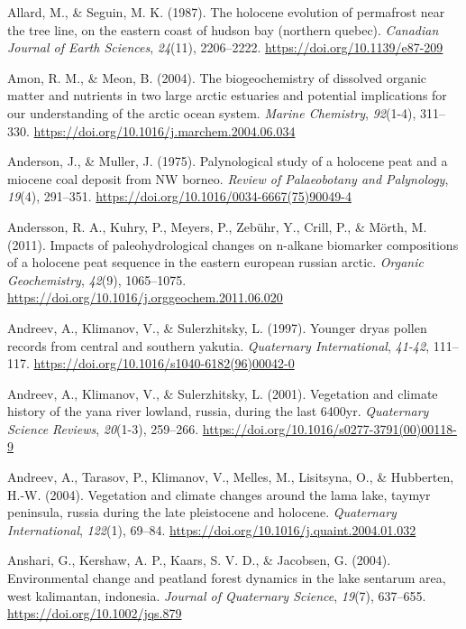 \documentclass[]{article}
\begin{document}
\leavevmode\hypertarget{ref-Allard_1987}{}%
Allard, M., \& Seguin, M. K. (1987). The holocene evolution of
permafrost near the tree line, on the eastern coast of hudson bay
(northern quebec). \emph{Canadian Journal of Earth Sciences},
\emph{24}(11), 2206--2222. \url{https://doi.org/10.1139/e87-209}

\leavevmode\hypertarget{ref-Amon_2004}{}%
Amon, R. M., \& Meon, B. (2004). The biogeochemistry of dissolved
organic matter and nutrients in two large arctic estuaries and potential
implications for our understanding of the arctic ocean system.
\emph{Marine Chemistry}, \emph{92}(1-4), 311--330.
\url{https://doi.org/10.1016/j.marchem.2004.06.034}

\leavevmode\hypertarget{ref-Anderson_1975}{}%
Anderson, J., \& Muller, J. (1975). Palynological study of a holocene
peat and a miocene coal deposit from NW borneo. \emph{Review of
Palaeobotany and Palynology}, \emph{19}(4), 291--351.
\url{https://doi.org/10.1016/0034-6667(75)90049-4}

\leavevmode\hypertarget{ref-Andersson_2011}{}%
Andersson, R. A., Kuhry, P., Meyers, P., Zebühr, Y., Crill, P., \&
Mörth, M. (2011). Impacts of paleohydrological changes on n-alkane
biomarker compositions of a holocene peat sequence in the eastern
european russian arctic. \emph{Organic Geochemistry}, \emph{42}(9),
1065--1075. \url{https://doi.org/10.1016/j.orggeochem.2011.06.020}

\leavevmode\hypertarget{ref-Andreev_1997}{}%
Andreev, A., Klimanov, V., \& Sulerzhitsky, L. (1997). Younger dryas
pollen records from central and southern yakutia. \emph{Quaternary
International}, \emph{41-42}, 111--117.
\url{https://doi.org/10.1016/s1040-6182(96)00042-0}

\leavevmode\hypertarget{ref-Andreev_2001}{}%
Andreev, A., Klimanov, V., \& Sulerzhitsky, L. (2001). Vegetation and
climate history of the yana river lowland, russia, during the last
6400yr. \emph{Quaternary Science Reviews}, \emph{20}(1-3), 259--266.
\url{https://doi.org/10.1016/s0277-3791(00)00118-9}

\leavevmode\hypertarget{ref-Andreev_2004}{}%
Andreev, A., Tarasov, P., Klimanov, V., Melles, M., Lisitsyna, O., \&
Hubberten, H.-W. (2004). Vegetation and climate changes around the lama
lake, taymyr peninsula, russia during the late pleistocene and holocene.
\emph{Quaternary International}, \emph{122}(1), 69--84.
\url{https://doi.org/10.1016/j.quaint.2004.01.032}

\leavevmode\hypertarget{ref-Anshari_2004}{}%
Anshari, G., Kershaw, A. P., Kaars, S. V. D., \& Jacobsen, G. (2004).
Environmental change and peatland forest dynamics in the lake sentarum
area, west kalimantan, indonesia. \emph{Journal of Quaternary Science},
\emph{19}(7), 637--655. \url{https://doi.org/10.1002/jqs.879}
\end{document}
